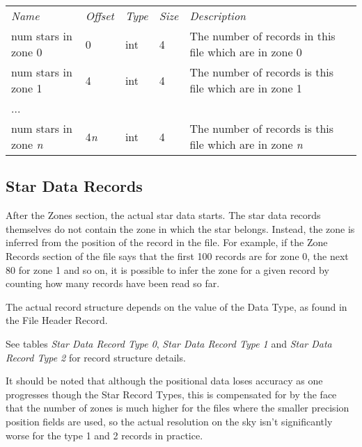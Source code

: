 \begin{longtable}[c]{@{}lllll@{}}
\toprule
\emph{Name} & \emph{Offset} & \emph{Type} & \emph{Size} &
\emph{Description}\tabularnewline
num stars in zone 0 & 0 & int & 4 & The number of records in this file
which are in zone 0\tabularnewline
num stars in zone 1 & 4 & int & 4 & The number of records is this file
which are in zone 1\tabularnewline
... & & & &\tabularnewline
num stars in zone \emph{n} & 4\emph{n} & int & 4 & The number of records
is this file which are in zone \emph{n}\tabularnewline
\bottomrule
\end{longtable}

\subsection{Star Data Records}\label{star-data-records}

After the Zones section, the actual star data starts. The star data
records themselves do not contain the zone in which the star belongs.
Instead, the zone is inferred from the position of the record in the
file. For example, if the Zone Records section of the file says that the
first 100 records are for zone 0, the next 80 for zone 1 and so on, it
is possible to infer the zone for a given record by counting how many
records have been read so far.

The actual record structure depends on the value of the Data Type, as
found in the File Header Record.

See tables \emph{Star Data Record Type 0}, \emph{Star Data Record Type
1} and \emph{Star Data Record Type 2} for record structure details.

It should be noted that although the positional data loses accuracy as
one progresses though the Star Record Types, this is compensated for by
the face that the number of zones is much higher for the files where the
smaller precision position fields are used, so the actual resolution on
the sky isn't significantly worse for the type 1 and 2 records in
practice.

